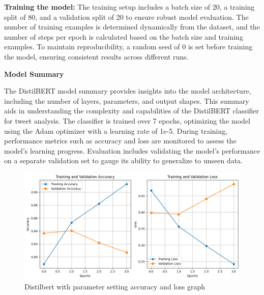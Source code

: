 \textbf{Training the model:}
The training setup includes a batch size of 20, a training split of 80, and a validation split of 20 to ensure robust model evaluation.
The number of training examples is determined dynamically from the dataset, and the number of steps per epoch is calculated based on the batch size and training examples. To maintain reproducibility, a random seed of 0 is set before training the model, ensuring consistent results across different runs.

\textbf{Model Summary}

The DistilBERT model summary provides insights into the model architecture, including the number of layers, parameters, and output shapes.
This summary aids in understanding the complexity and capabilities of the DistilBERT classifier for tweet analysis.
The classifier is trained over 7 epochs, optimizing the model using the Adam optimizer with a learning rate of 1e-5.
During training, performance metrics such as accuracy and loss are monitored to assess the model's learning progress.
Evaluation includes validating the model's performance on a separate validation set to gauge its ability to generalize to unseen data.

\begin{figure}[ht]
    \centering
    \includegraphics[scale=0.7]{figures/noautotune_trainingValidation.png}
    \caption{Distilbert with parameter setting accuracy and loss graph}
\end{figure}

